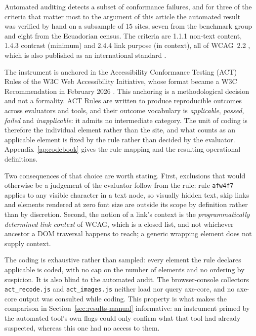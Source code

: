 \documentclass[pdflatex,sn-basic,Numbered,iicol]{sn-jnl}
\theoremstyle{thmstyleone}
\theoremstyle{thmstyletwo}
\theoremstyle{thmstylethree}
\begin{document}
Automated auditing detects a subset of conformance failures, and for three of the criteria that matter most to the argument of this article the automated result was verified by hand on a subsample of 15 sites, seven from the benchmark group and eight from the Ecuadorian census. The criteria are 1.1.1 non-text content, 1.4.3 contrast (minimum) and 2.4.4 link purpose (in context), all of WCAG~2.2 \citep{wcag22}, which is also published as an international standard \citep{iso40500}.

The instrument is anchored in the Accessibility Conformance Testing (ACT) Rules of the W3C Web Accessibility Initiative, whose format became a W3C Recommendation in February 2026 \citep{actformat}. This anchoring is a methodological decision and not a formality. ACT Rules are written to produce reproducible outcomes across evaluators and tools, and their outcome vocabulary is \emph{applicable}, \emph{passed}, \emph{failed} and \emph{inapplicable}: it admits no intermediate category. The unit of coding is therefore the individual element rather than the site, and what counts as an applicable element is fixed by the rule rather than decided by the evaluator. Appendix~\ref{ap:codebook} gives the rule mapping \citep{actrules} and the resulting operational definitions.

Two consequences of that choice are worth stating. First, exclusions that would otherwise be a judgement of the evaluator follow from the rule: rule \texttt{afw4f7} applies to any visible character in a text node, so visually hidden text, skip links and elements rendered at zero font size are outside its scope by definition rather than by discretion. Second, the notion of a link's context is the \emph{programmatically determined link context} of WCAG, which is a closed list, and not whichever ancestor a DOM traversal happens to reach; a generic wrapping element does not supply context.

The coding is exhaustive rather than sampled: every element the rule declares applicable is coded, with no cap on the number of elements and no ordering by suspicion. It is also blind to the automated audit. The browser-console collectors \texttt{act\_recode.js} and \texttt{act\_images.js} neither load nor query axe-core, and no axe-core output was consulted while coding. This property is what makes the comparison in Section~\ref{sec:results-manual} informative: an instrument primed by the automated tool's own flags could only confirm what that tool had already suspected, whereas this one had no access to them.
\end{document}
